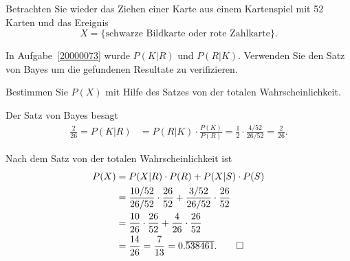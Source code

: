 Betrachten Sie wieder das Ziehen einer Karte aus einem Kartenspiel
mit 52 Karten und das Ereignis
\[
X
=
\{
\text{schwarze Bildkarte oder rote Zahlkarte}
\}.
\]

\begin{teilaufgaben}
\item
In Aufgabe~\ref{20000073} wurde $P(K|R)$ und $P(R|K)$.
Verwenden Sie den Satz von Bayes um die gefundenen Resultate zu
verifizieren.
\item
Bestimmen Sie $P(X)$ mit Hilfe des Satzes von der totalen Wahrscheinlichkeit.
\end{teilaufgaben}

\begin{loesung}
\begin{teilaufgaben}
\item
Der Satz von Bayes besagt
\begin{align*}
\frac{2}{26}
=
P(K|R)
&=
P(R|K)\cdot \frac{P(K)}{P(R)}
=
\frac{1}{2}
\cdot
\frac{4/52}{26/52}
=
\frac{2}{26}.
\end{align*}
\item
Nach dem Satz von der totalen Wahrscheinlichkeit ist
\begin{align*}
P(X)
&=
P(X|R) \cdot P(R) + P(X|S) \cdot P(S)
\\
&=
\frac{10/52}{26/52}\cdot \frac{26}{52}
+
\frac{3/52}{26/52}\cdot \frac{26}{52}
\\
&=
\frac{10}{26} \cdot \frac{26}{52}
+
\frac{4}{26} \cdot \frac{26}{52}
\\
&=
\frac{14}{26}
=
\frac{7}{13}
=
0.\overline{538461}.
\qedhere
\end{align*}
\end{teilaufgaben}
\end{loesung}
